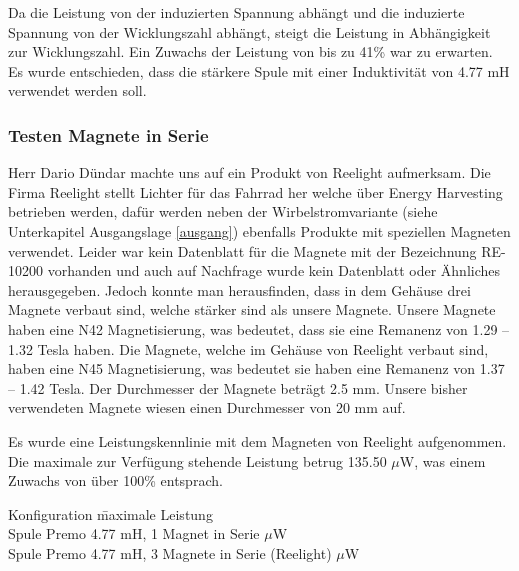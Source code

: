 Da die Leistung von der induzierten Spannung abhängt und die induzierte Spannung von der Wicklungszahl abhängt, steigt die Leistung in Abhängigkeit zur Wicklungszahl. Ein Zuwachs der Leistung von bis zu 41\thinspace\% war zu erwarten. Es wurde entschieden, dass die stärkere Spule mit einer Induktivität von 4.77 mH verwendet werden soll.

\subsubsection{Testen Magnete in Serie}

Herr Dario Dündar machte uns auf ein Produkt von Reelight aufmerksam. Die Firma Reelight stellt Lichter für das Fahrrad her welche über Energy Harvesting betrieben werden, dafür werden neben der Wirbelstromvariante (siehe Unterkapitel Ausgangslage \ref{ausgang}) ebenfalls Produkte mit speziellen Magneten verwendet. Leider war kein Datenblatt für die Magnete mit der Bezeichnung RE-10200 vorhanden und auch auf Nachfrage wurde kein Datenblatt oder Ähnliches herausgegeben. Jedoch konnte man herausfinden, dass in dem Gehäuse drei Magnete verbaut sind, welche stärker sind als unsere Magnete. Unsere Magnete haben eine N42 Magnetisierung, was bedeutet, dass sie eine Remanenz von 1.29 – 1.32 Tesla haben. Die Magnete, welche im Gehäuse von Reelight verbaut sind, haben eine N45 Magnetisierung, was bedeutet sie haben eine Remanenz von 1.37 – 1.42 Tesla. Der Durchmesser der Magnete beträgt 2.5 mm. Unsere bisher verwendeten Magnete wiesen einen Durchmesser von 20 mm auf.
 

Es wurde eine Leistungskennlinie mit dem Magneten von Reelight aufgenommen. Die maximale zur Verfügung stehende Leistung betrug 135.50 $\mu$W, was einem Zuwachs von über 100\thinspace\% entsprach.\\

\begin{tabbing}
    Konfiguration\hphantom{4.77 mH, 3 Magnete in Serie (Reelight)}   \quad\= maximale Leistung    \\[0.8ex]
    Spule Premo 4.77 mH, 1 Magnet in Serie         $\mu$W\\
	Spule Premo 4.77 mH, 3 Magnete in Serie (Reelight)         $\mu$W\\
\end{tabbing}

